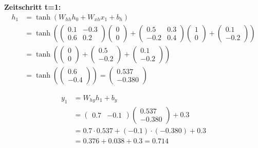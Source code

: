 ﻿\documentclass[12pt,a4paper]{article}
\begin{document}
\textbf{Zeitschritt t=1:}
\begin{align}
h_1 &= \tanh\left(W_{hh} h_0 + W_{xh} x_1 + b_h\right) \\
&= \tanh\left(\begin{pmatrix} 0.1 & -0.3 \\ 0.6 & 0.2 \end{pmatrix} \begin{pmatrix} 0 \\ 0 \end{pmatrix} + \begin{pmatrix} 0.5 & 0.3 \\ -0.2 & 0.4 \end{pmatrix} \begin{pmatrix} 1 \\ 0 \end{pmatrix} + \begin{pmatrix} 0.1 \\ -0.2 \end{pmatrix}\right) \\
&= \tanh\left(\begin{pmatrix} 0 \\ 0 \end{pmatrix} + \begin{pmatrix} 0.5 \\ -0.2 \end{pmatrix} + \begin{pmatrix} 0.1 \\ -0.2 \end{pmatrix}\right) \\
&= \tanh\left(\begin{pmatrix} 0.6 \\ -0.4 \end{pmatrix}\right) = \begin{pmatrix} 0.537 \\ -0.380 \end{pmatrix}
\end{align}

\begin{align}
y_1 &= W_{hy} h_1 + b_y \\
&= \begin{pmatrix} 0.7 & -0.1 \end{pmatrix} \begin{pmatrix} 0.537 \\ -0.380 \end{pmatrix} + 0.3 \\
&= 0.7 \cdot 0.537 + (-0.1) \cdot (-0.380) + 0.3 \\
&= 0.376 + 0.038 + 0.3 = 0.714
\end{align}
\end{document}

